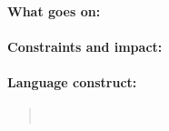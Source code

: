 \documentclass[a4paper]{article}
\begin{document}
\paragraph{What goes on:}
\paragraph{Constraints and impact:}
\paragraph{Language construct:}
\begin{quote}\tt
\end{quote}





\end{document}
